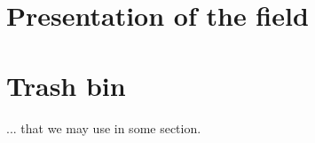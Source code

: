 \documentclass[12pt]{book}
\begin{document}

%
%


%
%

\dominitoc
\tableofcontents

%
%

%

%
%

%



%
%

\chapter{Presentation of the field}

\vfill\minitoc\newpage

\newpage
\newpage
\newpage

%
%

%


%
%

%
%

%
%

%
%

\setcounter{chapter}{-1}
\chapter{Trash bin}
... that we may use in some section.
\vfill\minitoc\newpage
\end{document}

